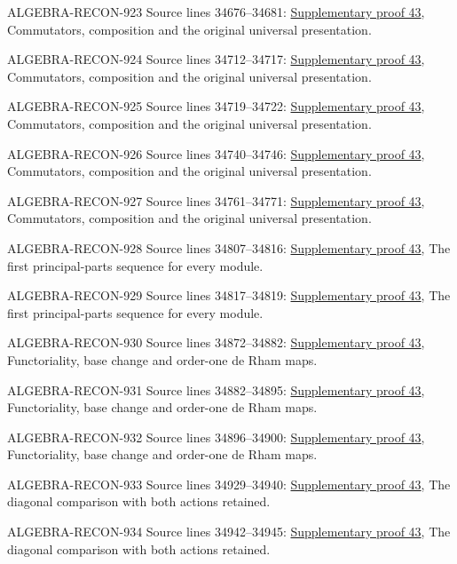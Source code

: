 \begin{AlgebraSourceRoutes}
\item[ALGEBRA-RECON-923] Source lines 34676--34681: \hyperlink{algebra_diff_operators_notes_20260928}{Supplementary proof 43}, Commutators, composition and the original universal presentation.
\item[ALGEBRA-RECON-924] Source lines 34712--34717: \hyperlink{algebra_diff_operators_notes_20260928}{Supplementary proof 43}, Commutators, composition and the original universal presentation.
\item[ALGEBRA-RECON-925] Source lines 34719--34722: \hyperlink{algebra_diff_operators_notes_20260928}{Supplementary proof 43}, Commutators, composition and the original universal presentation.
\item[ALGEBRA-RECON-926] Source lines 34740--34746: \hyperlink{algebra_diff_operators_notes_20260928}{Supplementary proof 43}, Commutators, composition and the original universal presentation.
\item[ALGEBRA-RECON-927] Source lines 34761--34771: \hyperlink{algebra_diff_operators_notes_20260928}{Supplementary proof 43}, Commutators, composition and the original universal presentation.
\item[ALGEBRA-RECON-928] Source lines 34807--34816: \hyperlink{algebra_diff_operators_notes_20260928}{Supplementary proof 43}, The first principal-parts sequence for every module.
\item[ALGEBRA-RECON-929] Source lines 34817--34819: \hyperlink{algebra_diff_operators_notes_20260928}{Supplementary proof 43}, The first principal-parts sequence for every module.
\item[ALGEBRA-RECON-930] Source lines 34872--34882: \hyperlink{algebra_diff_operators_notes_20260928}{Supplementary proof 43}, Functoriality, base change and order-one de Rham maps.
\item[ALGEBRA-RECON-931] Source lines 34882--34895: \hyperlink{algebra_diff_operators_notes_20260928}{Supplementary proof 43}, Functoriality, base change and order-one de Rham maps.
\item[ALGEBRA-RECON-932] Source lines 34896--34900: \hyperlink{algebra_diff_operators_notes_20260928}{Supplementary proof 43}, Functoriality, base change and order-one de Rham maps.
\item[ALGEBRA-RECON-933] Source lines 34929--34940: \hyperlink{algebra_diff_operators_notes_20260928}{Supplementary proof 43}, The diagonal comparison with both actions retained.
\item[ALGEBRA-RECON-934] Source lines 34942--34945: \hyperlink{algebra_diff_operators_notes_20260928}{Supplementary proof 43}, The diagonal comparison with both actions retained.

\end{AlgebraSourceRoutes}
